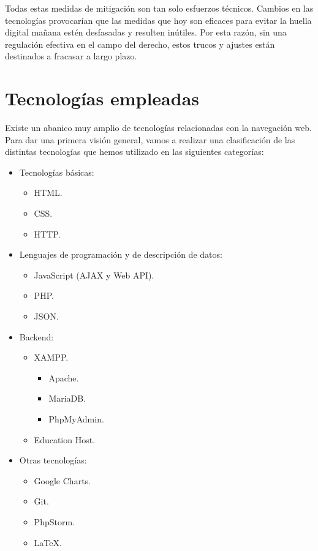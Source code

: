 Todas estas medidas de mitigación son tan solo esfuerzos técnicos. Cambios en las tecnologías provocarían que las medidas que hoy son eficaces para evitar la huella digital mañana estén desfasadas y resulten inútiles. Por esta razón, sin una regulación efectiva en el campo del derecho, estos trucos y ajustes están destinados a fracasar a largo plazo.  \par 

\section{Tecnologías empleadas}

Existe un abanico muy amplio de tecnologías \cite{web_mozilla} relacionadas con la navegación web. Para dar una primera visión general, vamos a realizar una clasificación de las distintas tecnologías que hemos utilizado en las siguientes categorías: \par
\begin{itemize}
	\item Tecnologías básicas:
		\begin{itemize}
			\item HTML.
			\item CSS.
			\item HTTP.
		\end{itemize}
	\item Lenguajes de programación y de descripción de datos:
		\begin{itemize}
			\item JavaScript (AJAX y Web API).
			\item PHP.
			\item JSON.
		\end{itemize}
	\item Backend:
		\begin{itemize}
			\item XAMPP.
				\begin{itemize}
					\item Apache.
					\item MariaDB.
					\item PhpMyAdmin.
				\end{itemize}
			\item Education Host.
		\end{itemize}
	\item Otras tecnologías:
		\begin{itemize}
			\item Google Charts.
			\item Git.
			\item PhpStorm.
			\item \LaTeX.
		\end{itemize}
\end{itemize}

